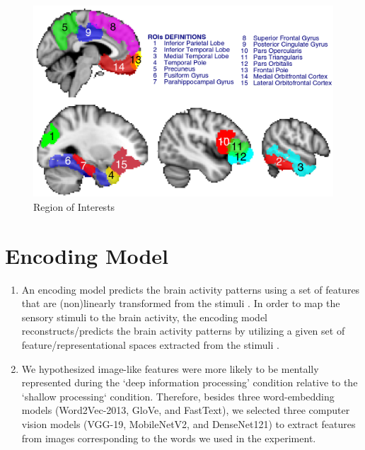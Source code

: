 \documentclass{sciposter}
\begin{document}
\begin{multicols}{3}
\begin{figure}
    \centering
    \includegraphics[width=1.\linewidth]{Fig2.png}
    \caption{Region of Interests}
    \label{fig2}
\end{figure}

\section{Encoding Model}

\begin{enumerate}
    \large
    \item An encoding model predicts the brain activity patterns using a set of features that are (non)linearly transformed from the stimuli \cite{Diedrichsenkriegeskorte2017a, KriegeskorteDouglas2018a}. In order to map the sensory stimuli to the brain activity, the encoding model reconstructs/predicts the brain activity patterns by utilizing a given set of feature/representational spaces extracted from the stimuli \cite{naselariskay2015a}.
    \item We hypothesized image-like features were more likely to be mentally represented during the ‘deep information processing’ condition relative to the ‘shallow processing‘ condition. Therefore, besides three word-embedding models (Word2Vec-2013, GloVe, and FastText), we selected three computer vision models (VGG-19, MobileNetV2, and DenseNet121) to extract features from images corresponding to the words we used in the experiment.
\end{enumerate}


\end{multicols}
\end{document}
